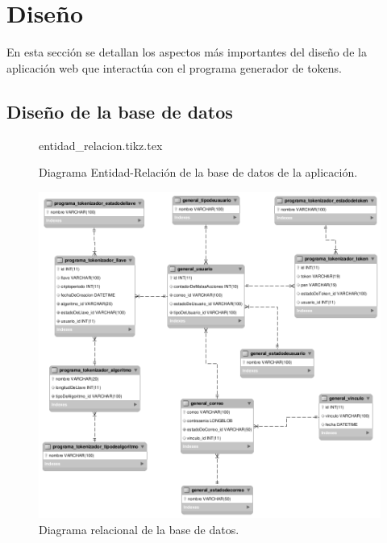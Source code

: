 %
%

\section{Diseño}

En esta sección se detallan los aspectos más importantes del diseño de la
aplicación web que interactúa con el programa generador de tokens.

\subsection{Diseño de la base de datos}

\begin{figure}
  \begin{center}
    {entidad_relacion.tikz.tex}
    \caption{Diagrama Entidad-Relación de la base de datos de la aplicación.}
    \label{fig:entidad_relacion}
  \end{center}
\end{figure}

\begin{figure}
  \begin{center}
    \includegraphics[width=1.0\linewidth]{diagramas/relacional_bn.png}
    \caption{Diagrama relacional de la base de datos.}
    \label{fig:relacional}
  \end{center}
\end{figure}

